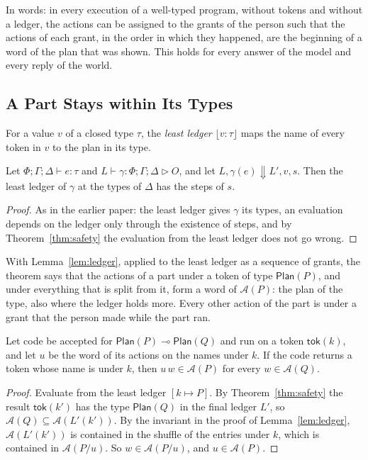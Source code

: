\documentclass[acmsmall,nonacm,screen]{acmart}
\newcommand{\kw}[1]{\mathsf{#1}}
\newcommand{\Plan}[1]{\kw{Plan}(#1)}
\newcommand{\tok}[1]{\kw{tok}(#1)}
\newcommand{\auth}[1]{\mathcal{A}(#1)}
\newcommand{\evto}{\Downarrow}
\newcommand{\own}{\mathrel{\triangleright}}
\newcommand{\least}[2]{\lfloor #1 : #2 \rfloor}
\begin{document}
In words: in every execution of a well-typed program, without tokens and without a ledger,
the actions can be assigned to the grants of the person such that the actions of each grant,
in the order in which they happened, are the beginning of a word of the plan that was shown.
This holds for every answer of the model and every reply of the world.

\subsection{A Part Stays within Its Types}

For a value $v$ of a closed type $\tau$, the \emph{least ledger} $\least{v}{\tau}$ maps the
name of every token in $v$ to the plan in its type.

\begin{theorem}[Authority]
\label{thm:authority}
Let $\Phi; \Gamma; \Delta \vdash e : \tau$ and $L \vdash \gamma : \Phi; \Gamma; \Delta \own O$,
and let $L, \gamma(e) \evto L', v, s$. Then the least ledger of $\gamma$ at the types of
$\Delta$ has the steps of $s$.
\end{theorem}

\begin{proof}
As in the earlier paper: the least ledger gives $\gamma$ its types, an evaluation depends on
the ledger only through the existence of steps, and by Theorem~\ref{thm:safety} the
evaluation from the least ledger does not go wrong.
\end{proof}

With Lemma~\ref{lem:ledger}, applied to the least ledger as a sequence of grants, the theorem
says that the actions of a part under a token of type $\Plan{P}$, and under everything that
is split from it, form a word of $\auth{P}$: the plan of the type, also where the ledger
holds more. Every other action of the part is under a grant that the person made while the
part ran.

\begin{corollary}[Lending]
\label{cor:lending}
Let code be accepted for $\Plan{P} \multimap \Plan{Q}$ and run on a token $\tok{k}$, and let
$u$ be the word of its actions on the names under $k$. If the code returns a token whose
name is under $k$, then $u\,w \in \auth{P}$ for every $w \in \auth{Q}$.
\end{corollary}

\begin{proof}
Evaluate from the least ledger $[k \mapsto P]$. By Theorem~\ref{thm:safety} the result
$\tok{k'}$ has the type $\Plan{Q}$ in the final ledger $L'$, so
$\auth{Q} \subseteq \auth{L'(k')}$. By the invariant in the proof of Lemma~\ref{lem:ledger},
$\auth{L'(k')}$ is contained in the shuffle of the entries under $k$, which is contained in
$\auth{P / u}$. So $w \in \auth{P / u}$, and $u \in \auth{P}$.
\end{proof}
\end{document}
